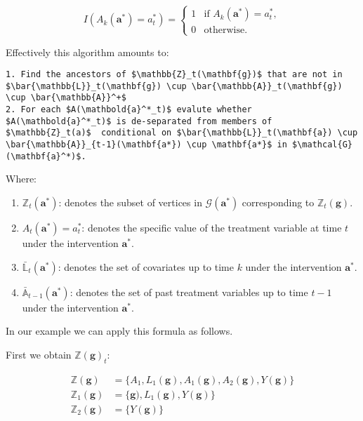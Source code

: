 \documentclass[
  single column]{article}
\providecommand{\tightlist}{%
  \setlength{\itemsep}{0pt}\setlength{\parskip}{0pt}}\usepackage{longtable,booktabs,array}
\begin{document}
\[
I(A_k(\mathbf{a}^*) = a^*_t) = 
\begin{cases} 
1 & \text{if } A_k(\mathbf{a}^*) = a^*_t, \\
0 & \text{otherwise}.
\end{cases}
\]

Effectively this algorithm amounts to:

\begin{verbatim}
1. Find the ancestors of $\mathbb{Z}_t(\mathbf{g})$ that are not in $\bar{\mathbb{L}}_t(\mathbf{g}) \cup \bar{\mathbb{A}}_t(\mathbf{g}) \cup \bar{\mathbb{A}}^+$
2. For each $A(\mathbold{a}^*_t)$ evalute whether $A(\mathbold{a}^*_t)$ is de-separated from members of $\mathbb{Z}_t(a)$  conditional on $\bar{\mathbb{L}}_t(\mathbf{a}) \cup \bar{\mathbb{A}}_{t-1}(\mathbf{a*}) \cup \mathbf{a*}$ in $\mathcal{G}(\mathbf{a}^*)$.
\end{verbatim}

Where:

\begin{enumerate}
\def\labelenumi{\arabic{enumi}.}
\tightlist
\item
  \textbf{\(\mathbb{Z}_t(\mathbf{a}^*)\)}: denotes the subset of
  vertices in \(\mathcal{G}(\mathbf{a}^*)\) corresponding to
  \(\mathbb{Z}_t(\mathbf{g})\).
\item
  \textbf{\(A_t(\mathbf{a}^*) = a^*_t\)}: denotes the specific value of
  the treatment variable at time \(t\) under the intervention
  \(\mathbf{a}^*\).
\item
  \textbf{\(\bar{\mathbb{L}}_t(\mathbf{a}^*)\)}: denotes the set of
  covariates up to time \(k\) under the intervention \(\mathbf{a}^*\).
\item
  \textbf{\(\bar{\mathbb{A}}_{t-1}(\mathbf{a}^*)\)}: denotes the set of
  past treatment variables up to time \(t-1\) under the intervention
  \(\mathbf{a}^*\).
\end{enumerate}

In our example we can apply this formula as follows.

First we obtain \(\mathbb{Z}(\mathbf{g})_t\):

\[
\begin{aligned}
\mathbb{Z}(\mathbf{g}) &= \{A_1, L_1(\mathbf{g}), A_1(\mathbf{g}), A_2(\mathbf{g}), Y(\mathbf{g})\} \\
\mathbb{Z}_1(\mathbf{g}) &= \{\mathbf{g}), L_1(\mathbf{g}), Y(\mathbf{g})\} \\
\mathbb{Z}_2(\mathbf{g}) &= \{Y(\mathbf{g})\}
\end{aligned}
\]
\end{document}
